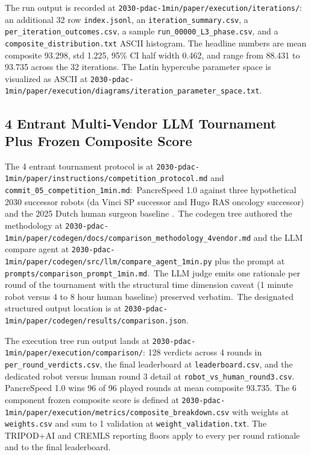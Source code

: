 The run output is recorded at
\texttt{2030-pdac-1min/paper/execution/iterations/}: an additional 32 row
\texttt{index.jsonl}, an \texttt{iteration_summary.csv}, a
\texttt{per_iteration_outcomes.csv}, a sample
\texttt{run_00000_L3_phase.csv}, and a
\texttt{composite_distribution.txt} ASCII histogram. The headline
numbers are mean composite 93.298, std 1.225, 95\% CI half width
0.462, and range from 88.431 to 93.735 across the 32 iterations.
The Latin hypercube parameter space is visualized as ASCII at
\texttt{2030-pdac-1min/paper/execution/diagrams/iteration_parameter_space.txt}.

\clearpage

\subsection{4 Entrant Multi-Vendor LLM Tournament Plus Frozen Composite Score}
\label{sec:methods-tournament}

The 4 entrant tournament protocol is at
\texttt{2030-pdac-1min/paper/instructions/competition_protocol.md}
and \texttt{commit_05_competition_1min.md}:\ PancreSpeed 1.0
against three hypothetical 2030 successor robots (da Vinci SP
successor and Hugo RAS oncology successor)
and the 2025 Dutch human surgeon baseline
\cite{DutchCohort2025Whipple}.\ The codegen tree authored the
methodology at
\texttt{2030-pdac-1min/paper/codegen/docs/comparison_methodology_4vendor.md}
and the LLM compare agent at
\texttt{2030-pdac-1min/paper/codegen/src/llm/compare_agent_1min.py}
plus the prompt at \texttt{prompts/comparison_prompt_1min.md}.\ The
LLM judge emits one rationale per round of the tournament with the structural time
dimension caveat (1 minute robot versus 4 to 8 hour human baseline)
preserved verbatim.\ The designated structured output location is at
\texttt{2030-pdac-1min/paper/codegen/results/comparison.json}.

The execution tree run output lands at
\texttt{2030-pdac-1min/paper/execution/comparison/}: 128 verdicts
across 4 rounds in \texttt{per_round_verdicts.csv}, the final
leaderboard at \texttt{leaderboard.csv}, and the dedicated robot
versus human round 3 detail at \texttt{robot_vs_human_round3.csv}.
PancreSpeed 1.0 wins 96 of 96 played rounds at mean composite
93.735. The 6 component frozen composite score is defined at
\texttt{2030-pdac-1min/paper/execution/metrics/composite_breakdown.csv}
with weights at \texttt{weights.csv} and sum to 1 validation at
\texttt{weight_validation.txt}. The TRIPOD+AI
\cite{Collins2024TRIPODAI} and CREMLS \cite{ElEmam2024CREMLS}
reporting floors apply to every per round rationale and to the
final leaderboard.

